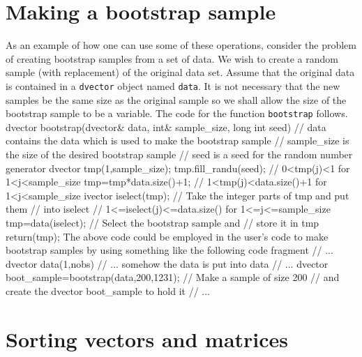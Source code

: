 \documentclass[12pt]{book}
\begin{document}
\section{Making a bootstrap sample}
As an example of how one can use some of these operations, consider the
problem of creating bootstrap samples from a set of data. 
We wish to create a random sample (with replacement) of the original data set.
Assume that the original data is contained in a {\tt dvector} object
named {\tt data}.
It is not necessary that the new samples be the same size as the original
sample so we shall allow the size of the bootstrap sample to be 
a variable. The code for the function {\tt bootstrap} follows.
\beginexample
dvector bootstrap(dvector& data, int& sample_size, long int seed)
{
  // data contains the data which is used to make the bootstrap sample
  // sample_size is the size of the desired bootstrap sample
  // seed is a seed for the random number generator 
  dvector tmp(1,sample_size);
  tmp.fill_randu(seed);  // 0<tmp(j)<1             for 1<j<sample_size
  tmp=tmp*data.size()+1; // 1<tmp(j)<data.size()+1 for 1<j<sample_size
  ivector iselect(tmp);  // Take the integer parts of tmp and put them
                         // into iselect
                         // 1<=iselect(j)<=data.size() for 1<=j<=sample_size
  tmp=data(iselect);     // Select the bootstrap sample and
                         // store it in tmp
  return(tmp);
} 
\endexample
The above  code could be employed in the user's code 
to make bootstrap samples by using something like the 
following code fragment 
\beginexample
// ...
dvector data(1,nobs)
// ... somehow the data is put into data
// ...
dvector boot_sample=bootstrap(data,200,1231); // Make a sample of size 200
                          // and create the dvector boot_sample to hold it
// ...
\endexample
\section{Sorting vectors and matrices}
\end{document}
